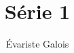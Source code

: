 \documentclass[11pt, a4paper, twoside]{article}
\begin{document}
\title{Série 1}
\author{Évariste Galois}
\maketitle


\end{document}
